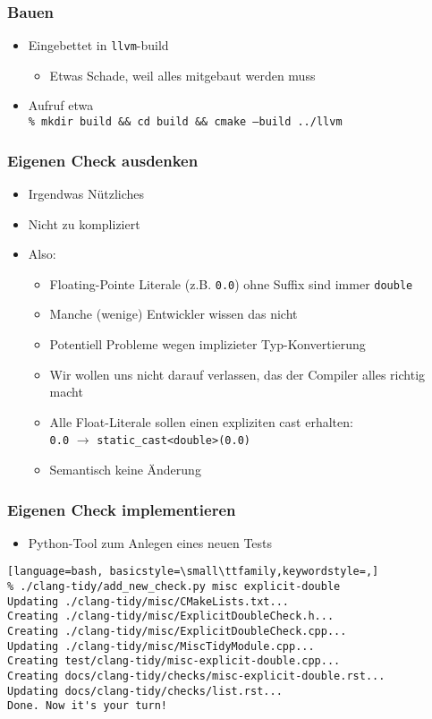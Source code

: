 \documentclass[aspectratio=169]{beamer}
\begin{document}
\begin{frame}
  \frametitle{Bauen}
  \begin{itemize}
  \item Eingebettet in \texttt{llvm}-build
    \begin{itemize}
    \item Etwas Schade, weil alles mitgebaut werden muss
    \end{itemize}
  \item Aufruf etwa\\
    \qquad \texttt{\% mkdir build \&\& cd build \&\& cmake --build ../llvm}
  \end{itemize}  
\end{frame}

\begin{frame}
  \frametitle{Eigenen Check ausdenken}
  \begin{itemize}
  \item Irgendwas Nützliches \pause  
  \item Nicht zu kompliziert \pause
  \item Also: \pause
    \begin{itemize}
    \item Floating-Pointe Literale (z.B. \texttt{0.0}) ohne Suffix sind immer \texttt{double}
    \item Manche (wenige) Entwickler wissen das nicht
    \item Potentiell Probleme wegen implizieter Typ-Konvertierung
    \item Wir wollen uns nicht darauf verlassen, das der Compiler alles richtig macht
    \item Alle Float-Literale sollen einen expliziten cast erhalten:\\
      \qquad \texttt{0.0} $\rightarrow$ \texttt{static\_cast<double>(0.0)}
    \item Semantisch keine Änderung
    \end{itemize}
  \end{itemize}
\end{frame}

\begin{frame}[fragile]
  \frametitle{Eigenen Check implementieren}
  \begin{itemize}
  \item Python-Tool zum Anlegen eines neuen Tests
  \end{itemize}
  \begin{lstlisting}[language=bash, basicstyle=\small\ttfamily,keywordstyle=,]
% ./clang-tidy/add_new_check.py misc explicit-double
Updating ./clang-tidy/misc/CMakeLists.txt...
Creating ./clang-tidy/misc/ExplicitDoubleCheck.h...
Creating ./clang-tidy/misc/ExplicitDoubleCheck.cpp...
Updating ./clang-tidy/misc/MiscTidyModule.cpp...
Creating test/clang-tidy/misc-explicit-double.cpp...
Creating docs/clang-tidy/checks/misc-explicit-double.rst...
Updating docs/clang-tidy/checks/list.rst...
Done. Now it's your turn!    
  \end{lstlisting}
\end{frame}
\end{document}

